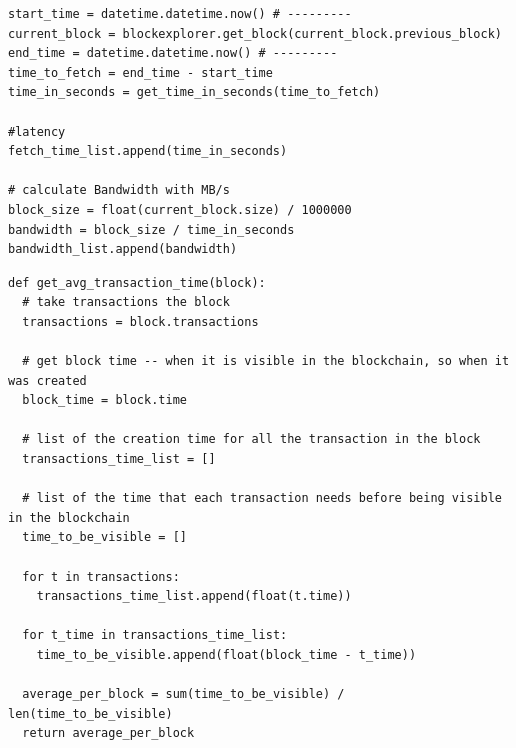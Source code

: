 \documentclass[USenglish]{uit-thesis}
\begin{document}
\begin{appendices}
\begin{lstlisting}[float, caption={How read bandwidth is calculated, using the function $datetime.now()$ before and after the \gls{api} call.}]
start_time = datetime.datetime.now() # ---------
current_block = blockexplorer.get_block(current_block.previous_block)
end_time = datetime.datetime.now() # ---------
time_to_fetch = end_time - start_time
time_in_seconds = get_time_in_seconds(time_to_fetch)

#latency
fetch_time_list.append(time_in_seconds)

# calculate Bandwidth with MB/s
block_size = float(current_block.size) / 1000000
bandwidth = block_size / time_in_seconds
bandwidth_list.append(bandwidth)
\end{lstlisting}

\begin{lstlisting}[float, caption={Function that get the average write bandwidth of the block, calculating the time for each transaction to be visible in the public ledger of data.}]
def get_avg_transaction_time(block):
  # take transactions the block
  transactions = block.transactions

  # get block time -- when it is visible in the blockchain, so when it was created
  block_time = block.time

  # list of the creation time for all the transaction in the block
  transactions_time_list = []

  # list of the time that each transaction needs before being visible in the blockchain
  time_to_be_visible = []

  for t in transactions:
    transactions_time_list.append(float(t.time))

  for t_time in transactions_time_list:
    time_to_be_visible.append(float(block_time - t_time))
    
  average_per_block = sum(time_to_be_visible) / len(time_to_be_visible)
  return average_per_block
\end{lstlisting}


\end{appendices}
\end{document}
